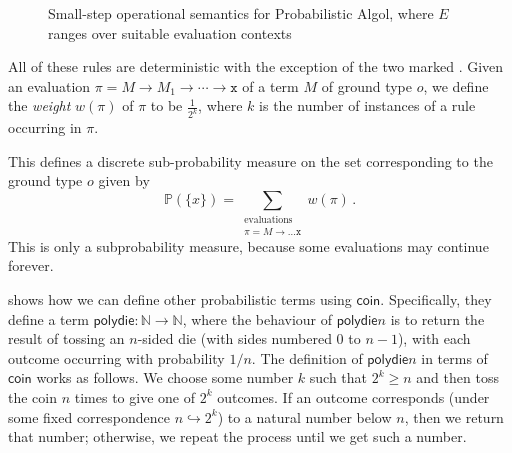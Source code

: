 \documentclass{svproc}
\makeatletter
\newcommand*\from{\colon}
\newcommand{\Y}{\mathbf{Y}}
\newcommand{\opto}{\longrightarrow}
\newcommand{\n}{{\mathtt{n}}}
\newcommand{\x}{{\mathtt{x}}}
\newcommand{\IfO}{{\mathtt{If0}\;}}
\newcommand{\If}{{\mathtt{If}\;}}
\newcommand{\suc}{{\mathtt{suc\;}}}
\newcommand{\pred}{{\mathtt{pred\;}}}
\newcommand{\0}{{\mathtt{0}}} \newcommand{\com}{{\mathtt{com}}}
\newcommand{\skipp}{{\mathsf{skip}}}
\newcommand{\mkvar}{{\mathsf{mkvar}\;}}
\newcommand{\deref}{\texttt{@}}
\newcommand{\ia}[2]{\langle #1 , #2 \rangle}
\newcommand{\stup}[3]{\langle #1 \mid #2 \mapsto #3 \rangle}
\newcommand{\new}{{\mathtt{new}}}
\newcommand{\true}{\mathbbm{t}}
\newcommand{\false}{\mathbbm{f}}
\newcommand{\bN}{\mathbb{N}}
\newcommand{\bP}{\mathbb{P}}
\newcommand{\coin}{\textsf{coin}}
\newcommand{\polydie}{\textsf{polydie}}
\makeatother
\begin{document}
\begin{figure*}
  \caption{Small-step operational semantics for Probabilistic Algol, where $E$ ranges over suitable evaluation contexts}
  \label{pa-operational}
\end{figure*}

All of these rules are deterministic with the exception of the two marked .
Given an evaluation $\pi = M \to M_1 \to \cdots \to \x$ of a term $M$ of ground type $o$, we define the \emph{weight} $w(\pi)$ of $\pi$ to be $\frac{1}{2^k}$, where $k$ is the number of instances of a  rule occurring in $\pi$.

This defines a discrete sub-probability measure on the set corresponding to the ground type $o$ given by
\[
  \bP(\{x\}) = \sum_{\substack{\text{evaluations}\\\pi = M \to\dots \x}}w(\pi)\,.
  \]
This is only a subprobability measure, because some evaluations may continue forever.

\cite{DanosHarmer} shows how we can define other probabilistic terms using $\coin$.  
Specifically, they define a term $\polydie\from\bN\to\bN$, where the behaviour of $\polydie n$ is to return the result of tossing an $n$-sided die (with sides numbered $0$ to $n-1$), with each outcome occurring with probability $1/n$.  
The definition of $\polydie n$ in terms of $\coin$ works as follows.  
We choose some number $k$ such that $2^k\ge n$ and then toss the coin $n$ times to give one of $2^k$ outcomes.  
If an outcome corresponds (under some fixed correspondence $n\hookrightarrow 2^k$) to a natural number below $n$, then we return that number; otherwise, we repeat the process until we get such a number.  
\end{document}
